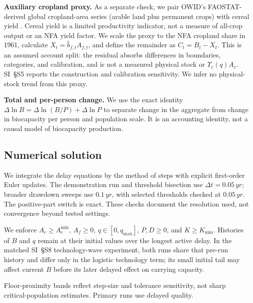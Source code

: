 \documentclass[preprint,12pt,authoryear]{elsarticle}
\newcommand{\Ups}{\Upsilon_c}
\newcommand{\Acmin}{A_c^{\min}}
\begin{document}
\begin{samepage}
\textbf{Auxiliary cropland proxy.} As a separate check, we pair OWID's FAOSTAT-derived global cropland-area series (arable land plus permanent crops) with cereal yield \citep{OWIDCereal2026,OWIDCropland2026}. Cereal yield is a limited productivity indicator, not a measure of all-crop output or an NFA yield factor. We scale the proxy to the NFA cropland share in 1961, calculate $X_t=\hat b_{f,t}A_{f,t}$, and define the remainder as $C_t=B_t-X_t$. This is an assumed account split: the residual absorbs differences in boundaries, categories, and calibration, and is not a measured physical stock or $\Ups(q)A_c$. SI~\S S5 reports the construction and calibration sensitivity. We infer no physical-stock trend from this proxy.\par
\end{samepage}

\textbf{Total and per-person change.} We use the exact identity $\Delta\ln B=\Delta\ln(B/P)+\Delta\ln P$ to separate change in the aggregate from change in biocapacity per person and population scale. It is an accounting identity, not a causal model of biocapacity production.

\subsection{Numerical solution}\label{sec:numerics}

We integrate the delay equations by the method of steps with explicit first-order Euler updates. The demonstration run and threshold bisection use $\Delta t=0.05\,yr$; broader drawdown sweeps use $0.1\,yr$, with selected thresholds checked at $0.05\,yr$. The positive-part switch is exact. These checks document the resolution used, not convergence beyond tested settings.

We enforce $A_c\ge\Acmin$, $A_f\ge0$, $q\in[0,q_{\max}]$, $P,D\ge0$, and $K\ge K_{\min}$. Histories of $B$ and $q$ remain at their initial values over the longest active delay. In the matched SI~\S S8 technology-wave experiment, both runs share that pre-run history and differ only in the logistic technology term; its small initial tail may affect current $B$ before its later delayed effect on carrying capacity.

Floor-proximity bands reflect step-size and tolerance sensitivity, not sharp critical-population estimates. Primary runs use delayed quality.
\end{document}
